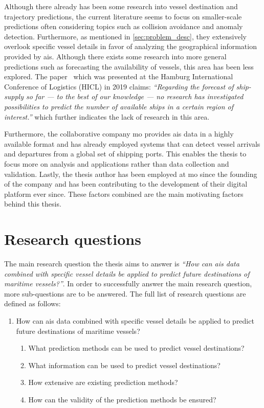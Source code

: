 Although there already has been some research into vessel destination and trajectory predictions, the current literature seems to focus on smaller-scale predictions often considering topics such as collision avoidance and anomaly detection. Furthermore, as mentioned in \cref{sec:problem_desc}, they extensively overlook specific vessel details in favor of analyzing the geographical information provided by \acrshort{ais}. Although there exists some research into more general predictions such as forecasting the availability of vessels, this area has been less explored. The paper~\cite{lechtenberg2019} which was presented at the Hamburg International Conference of Logistics (HICL) in 2019 claims: \textit{“Regarding the forecast of ship-supply so far --- to the best of our knowledge --- no research has investigated possibilities to predict the number of available ships in a certain region of interest.”} which further indicates the lack of research in this area.

Furthermore, the collaborative company \acrfull{mo} provides \acrshort{ais} data in a highly available format and has already employed systems that can detect vessel arrivals and departures from a global set of shipping ports. This enables the thesis to focus more on analysis and applications rather than data collection and validation. Lastly, the thesis author has been employed at \acrshort{mo} since the founding of the company and has been contributing to the development of their digital platform ever since. These factors combined are the main motivating factors behind this thesis.

\section{Research questions}
\label{sec:research_questions}

The main research question the thesis aims to answer is \textit{``How can \acrshort{ais} data combined with specific vessel details be applied to predict future destinations of maritime vessels?''}. In order to successfully answer the main research question, more sub-questions are to be answered. The full list of research questions are defined as follows:

\begin{enumerate}
    \item How can \acrshort{ais} data combined with specific vessel details be applied to predict future destinations of maritime vessels?
    \begin{enumerate}
    \item What prediction methods can be used to predict vessel destinations?
    \item What information can be used to predict vessel destinations?
    \item How extensive are existing prediction methods?
    \item How can the validity of the prediction methods be ensured?
    \end{enumerate}
\end{enumerate}

